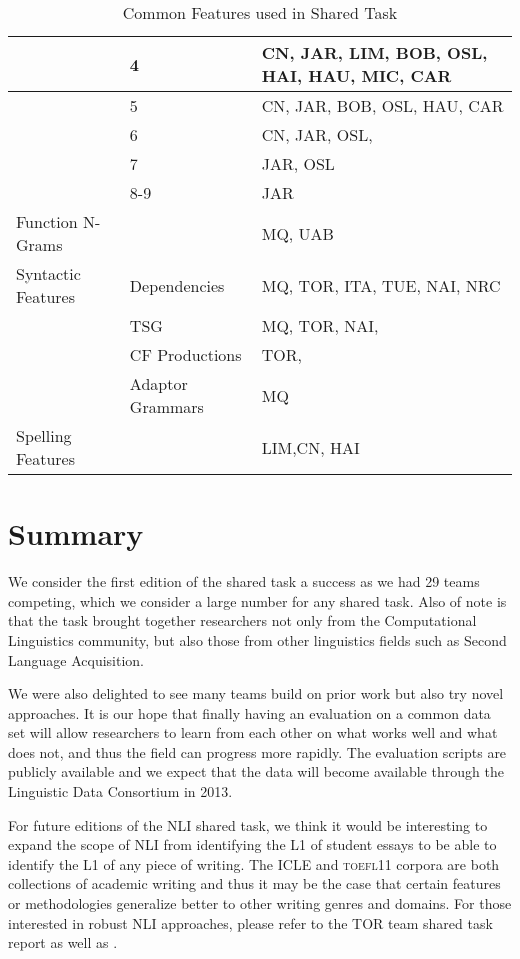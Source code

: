 \documentclass[11pt,letterpaper]{article}
\begin{document}
\begin{table*}[!ht]
\begin{center}
\begin{small}
\begin{tabular}{|l|l|p{9.5cm}|}
                   & 4      & CN, JAR, LIM, BOB, OSL, HAI, HAU, MIC, CAR \\ \hline
                   & 5      & CN, JAR, BOB, OSL, HAU, CAR  \\ \hline
                   & 6      & CN, JAR, OSL,   \\ \hline
	           & 7      & JAR, OSL \\ \hline
                   & 8-9    & JAR \\ \hline
Function N-Grams   &        & MQ, UAB  \\ \hline
Syntactic Features & Dependencies        & MQ, TOR, ITA, TUE, NAI, NRC \\ \hline
                   & TSG                 & MQ, TOR, NAI,  \\ \hline
                   & CF Productions      & TOR, \\ \hline
		   & Adaptor Grammars  & MQ  \\ \hline
Spelling Features  &        &   LIM,CN, HAI \\ \hline
\end{tabular}
\end{small}
\caption{Common Features used in Shared Task\label{tab:common-features}}
\end{center}
\end{table*}


\section{Summary}
\label{sec-summary}
We consider the first edition of the shared task a success as we had
29 teams competing, which we consider a large number for any
shared task.  Also of note is that the task brought together
researchers not only from the Computational Linguistics community,
but also those from other linguistics fields such as Second
Language Acquisition.

We were also delighted to see many teams build on
prior work but also try novel approaches.  It is our hope that
finally having an evaluation on a common data set
will allow researchers to learn from each
other on what works well and what does not, and thus the
field can progress more rapidly.  The evaluation scripts are
publicly available and we expect that the data will become
available through the Linguistic Data Consortium in 2013.

For future editions of the NLI shared task, we think it would be
interesting to expand the scope of NLI from identifying the L1
of student essays to be able to identify the L1 of any piece of
writing.  The ICLE and \textsc{toefl11} corpora are both
collections of academic writing and thus it may be the case that
certain features or methodologies generalize better to other
writing genres and domains.  For those interested in robust
NLI approaches, please refer to the TOR team shared task report
as well as .
\end{document}
